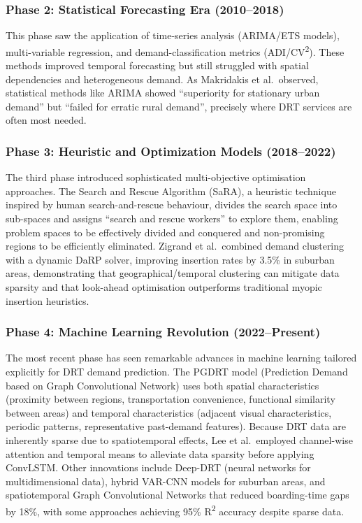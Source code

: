 \documentclass[12pt]{article}
\begin{document}
\subsubsection{Phase 2: Statistical Forecasting Era (2010--2018)}
This phase saw the application of time-series analysis (ARIMA/ETS models),
multi-variable regression, and demand-classification metrics (ADI/CV\textsuperscript{2}).
These methods improved temporal forecasting but still struggled with spatial
dependencies and heterogeneous demand. As Makridakis et al.\ observed, statistical
methods like ARIMA showed ``superiority for stationary urban demand'' but ``failed
for erratic rural demand'', precisely where DRT services are often most needed.

\subsubsection{Phase 3: Heuristic and Optimization Models (2018--2022)}
The third phase introduced sophisticated multi-objective optimisation approaches.
The Search and Rescue Algorithm (SaRA), a heuristic technique inspired by human
search-and-rescue behaviour, divides the search space into sub-spaces and assigns
``search and rescue workers'' to explore them, enabling problem spaces to be
effectively divided and conquered and non-promising regions to be efficiently
eliminated. Zigrand et al.\ combined demand clustering with a dynamic DaRP solver,
improving insertion rates by 3.5\% in suburban areas, demonstrating that
geographical/temporal clustering can mitigate data sparsity and that look-ahead
optimisation outperforms traditional myopic insertion heuristics.

\subsubsection{Phase 4: Machine Learning Revolution (2022--Present)}
The most recent phase has seen remarkable advances in machine learning tailored
explicitly for DRT demand prediction. The PGDRT model (Prediction Demand based on
Graph Convolutional Network) uses both spatial characteristics (proximity between
regions, transportation convenience, functional similarity between areas) and
temporal characteristics (adjacent visual characteristics, periodic patterns,
representative past-demand features). Because DRT data are inherently sparse due to
spatiotemporal effects, Lee et al.\ employed channel-wise attention and temporal
means to alleviate data sparsity before applying ConvLSTM. Other innovations include
Deep-DRT (neural networks for multidimensional data), hybrid VAR-CNN models for
suburban areas, and spatiotemporal Graph Convolutional Networks that reduced
boarding-time gaps by 18\%, with some approaches achieving 95\% R\textsuperscript{2}
accuracy despite sparse data.
\end{document}

